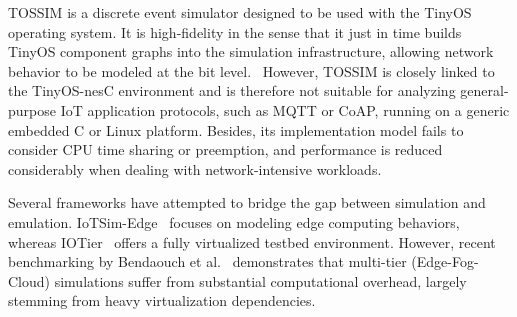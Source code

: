 \documentclass[jsan,article,submit,moreauthors,pdftex]{Definitions/mdpi}
\begin{document}
TOSSIM \cite{10.1145/958491.958506} is a discrete event simulator designed to be used with the TinyOS operating system. It is high-fidelity in the sense that it just in time builds TinyOS component graphs into the simulation infrastructure, allowing network behavior to be modeled at the bit level.  However, TOSSIM is closely linked to the TinyOS-nesC environment and is therefore not suitable for analyzing general-purpose {IoT} application protocols, such as MQTT or CoAP, running on a generic embedded C or Linux platform. Besides, its implementation model fails to consider CPU time sharing or preemption, and performance is reduced considerably when dealing with network-intensive workloads.

Several frameworks have attempted to bridge the gap between simulation and emulation. IoTSim-Edge~\cite{jha2020iotsim} focuses on modeling edge computing behaviors, whereas IOTier~\cite{nikolaidis2021iotier} offers a fully virtualized testbed environment. However, recent benchmarking by Bendaouch et al.~\cite{bendaouch2025benchmarking} demonstrates that multi-tier (Edge-Fog-Cloud) simulations suffer from substantial computational overhead, largely stemming from heavy virtualization dependencies.
\end{document}
